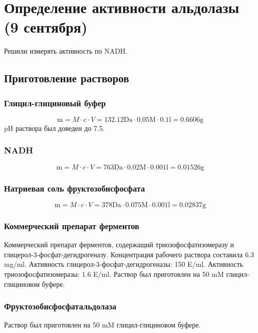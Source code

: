 \section{Определение активности альдолазы (9 сентября)}

Решили измерять активность по NADH.

\def\svgwidth{0.7\linewidth}

\subsection{Приготовление растворов}

\subsubsection{Глицил-глициновый буфер}
$$ \text{m} = M \cdot c \cdot V =
    132.12 \text{Da} \cdot 0.05 \text{M} \cdot 0.1 \text{l} = 0.6606 \text {g} $$
pH раствора был доведен до 7.5.

\subsubsection{NADH}
$$ \text{m} = M \cdot c \cdot V =
    763 \text{Da} \cdot 0.02 \text{M} \cdot 0.001 \text{l} = 0.01526 \text {g} $$

\subsubsection{Натриевая соль фруктозобисфосфата}
$$ \text{m} = M \cdot c \cdot V =
    378 \text{Da} \cdot 0.075 \text{M} \cdot 0.001 \text{l} = 0.02837 \text {g} $$

\subsubsection{Коммерческий препарат ферментов}
Коммерческий препарат ферментов, содержащий триозофосфатизомеразу и
глицерол-3-фосфат-дегидрогеназу.
Концентрация рабочего раствора составила 6.3 mg/ml.
Активность глицерол-3-фосфат-дегидрогеназы: 150 E/ml.
Активность триозофосфатизомеразы: 1.6 E/ml.
Раствор был приготовлен на 50 mM глицил-глициновом буфере.

\subsubsection{Фруктозобисфосфатальдолаза}
Раствор был приготовлен на 50 mM глицил-глициновом буфере.

